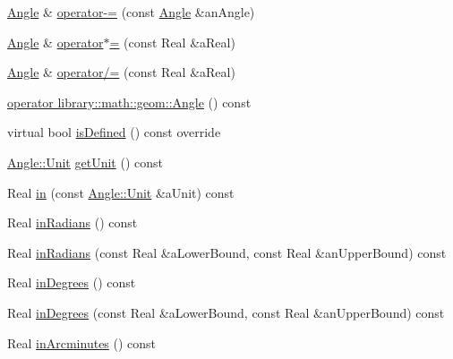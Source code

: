 \begin{DoxyCompactItemize}
\item 
\hyperlink{classlibrary_1_1physics_1_1units_1_1_angle}{Angle} \& \hyperlink{classlibrary_1_1physics_1_1units_1_1_angle_a2278161c893f91578913951c62f29c39}{operator-\/=} (const \hyperlink{classlibrary_1_1physics_1_1units_1_1_angle}{Angle} \&an\+Angle)
\item 
\hyperlink{classlibrary_1_1physics_1_1units_1_1_angle}{Angle} \& \hyperlink{classlibrary_1_1physics_1_1units_1_1_angle_af14d361f18244d859a3829c40aba6a14}{operator$\ast$=} (const Real \&a\+Real)
\item 
\hyperlink{classlibrary_1_1physics_1_1units_1_1_angle}{Angle} \& \hyperlink{classlibrary_1_1physics_1_1units_1_1_angle_a55f228924439a814b8727ae62585df95}{operator/=} (const Real \&a\+Real)
\item 
\hyperlink{classlibrary_1_1physics_1_1units_1_1_angle_a1745d0762e2791835c835e79219b005b}{operator library\+::math\+::geom\+::\+Angle} () const
\item 
virtual bool \hyperlink{classlibrary_1_1physics_1_1units_1_1_angle_a77c7849734ce02b55e070fb88fd87f71}{is\+Defined} () const override
\item 
\hyperlink{classlibrary_1_1physics_1_1units_1_1_angle_a3c329d415a61783b16ce481874cc5956}{Angle\+::\+Unit} \hyperlink{classlibrary_1_1physics_1_1units_1_1_angle_a44ca98d9a05643948f5d3bee79bcba63}{get\+Unit} () const
\item 
Real \hyperlink{classlibrary_1_1physics_1_1units_1_1_angle_aa641b9b6dabfe5fa0b546a2d6492e5be}{in} (const \hyperlink{classlibrary_1_1physics_1_1units_1_1_angle_a3c329d415a61783b16ce481874cc5956}{Angle\+::\+Unit} \&a\+Unit) const
\item 
Real \hyperlink{classlibrary_1_1physics_1_1units_1_1_angle_ab6157462a9d4afe64f4dd11d1b684af9}{in\+Radians} () const
\item 
Real \hyperlink{classlibrary_1_1physics_1_1units_1_1_angle_a6dfbf2ff95818818cecfd60e121dfb75}{in\+Radians} (const Real \&a\+Lower\+Bound, const Real \&an\+Upper\+Bound) const
\item 
Real \hyperlink{classlibrary_1_1physics_1_1units_1_1_angle_a58528bdfdbd6976ee88055809c835e68}{in\+Degrees} () const
\item 
Real \hyperlink{classlibrary_1_1physics_1_1units_1_1_angle_a21fa4d9aa81f1e27d9869e0c8a9cb46b}{in\+Degrees} (const Real \&a\+Lower\+Bound, const Real \&an\+Upper\+Bound) const
\item 
Real \hyperlink{classlibrary_1_1physics_1_1units_1_1_angle_a10195e20b7540e0813c3b2a13c8bf453}{in\+Arcminutes} () const

\end{DoxyCompactItemize}
